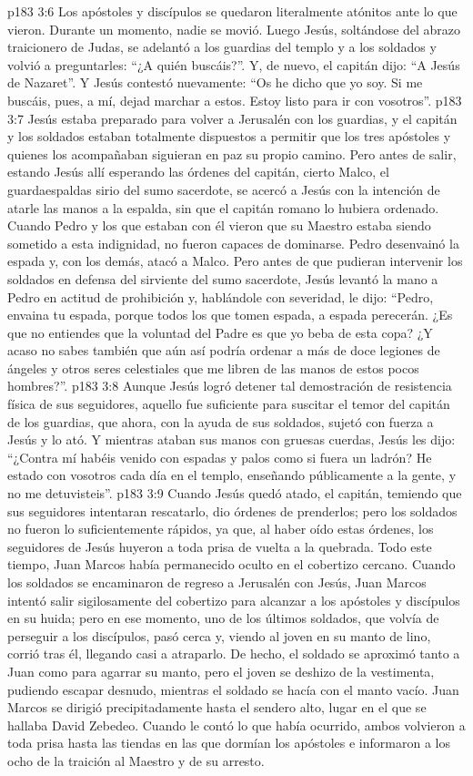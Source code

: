 \vs p183 3:6 Los apóstoles y discípulos se quedaron literalmente atónitos ante lo que vieron. Durante un momento, nadie se movió. Luego Jesús, soltándose del abrazo traicionero de Judas, se adelantó a los guardias del templo y a los soldados y volvió a preguntarles: “¿A quién buscáis?”. Y, de nuevo, el capitán dijo: “A Jesús de Nazaret”. Y Jesús contestó nuevamente: “Os he dicho que yo soy. Si me buscáis, pues, a mí, dejad marchar a estos. Estoy listo para ir con vosotros”.
\vs p183 3:7 Jesús estaba preparado para volver a Jerusalén con los guardias, y el capitán y los soldados estaban totalmente dispuestos a permitir que los tres apóstoles y quienes los acompañaban siguieran en paz su propio camino. Pero antes de salir, estando Jesús allí esperando las órdenes del capitán, cierto Malco, el guardaespaldas sirio del sumo sacerdote, se acercó a Jesús con la intención de atarle las manos a la espalda, sin que el capitán romano lo hubiera ordenado. Cuando Pedro y los que estaban con él vieron que su Maestro estaba siendo sometido a esta indignidad, no fueron capaces de dominarse. Pedro desenvainó la espada y, con los demás, atacó a Malco. Pero antes de que pudieran intervenir los soldados en defensa del sirviente del sumo sacerdote, Jesús levantó la mano a Pedro en actitud de prohibición y, hablándole con severidad, le dijo: “Pedro, envaina tu espada, porque todos los que tomen espada, a espada perecerán. ¿Es que no entiendes que la voluntad del Padre es que yo beba de esta copa? ¿Y acaso no sabes también que aún así podría ordenar a más de doce legiones de ángeles y otros seres celestiales que me libren de las manos de estos pocos hombres?”.
\vs p183 3:8 Aunque Jesús logró detener tal demostración de resistencia física de sus seguidores, aquello fue suficiente para suscitar el temor del capitán de los guardias, que ahora, con la ayuda de sus soldados, sujetó con fuerza a Jesús y lo ató. Y mientras ataban sus manos con gruesas cuerdas, Jesús les dijo: “¿Contra mí habéis venido con espadas y palos como si fuera un ladrón? He estado con vosotros cada día en el templo, enseñando públicamente a la gente, y no me detuvisteis”.
\vs p183 3:9 Cuando Jesús quedó atado, el capitán, temiendo que sus seguidores intentaran rescatarlo, dio órdenes de prenderlos; pero los soldados no fueron lo suficientemente rápidos, ya que, al haber oído estas órdenes, los seguidores de Jesús huyeron a toda prisa de vuelta a la quebrada. Todo este tiempo, Juan Marcos había permanecido oculto en el cobertizo cercano. Cuando los soldados se encaminaron de regreso a Jerusalén con Jesús, Juan Marcos intentó salir sigilosamente del cobertizo para alcanzar a los apóstoles y discípulos en su huida; pero en ese momento, uno de los últimos soldados, que volvía de perseguir a los discípulos, pasó cerca y, viendo al joven en su manto de lino, corrió tras él, llegando casi a atraparlo. De hecho, el soldado se aproximó tanto a Juan como para agarrar su manto, pero el joven se deshizo de la vestimenta, pudiendo escapar desnudo, mientras el soldado se hacía con el manto vacío. Juan Marcos se dirigió precipitadamente hasta el sendero alto, lugar en el que se hallaba David Zebedeo. Cuando le contó lo que había ocurrido, ambos volvieron a toda prisa hasta las tiendas en las que dormían los apóstoles e informaron a los ocho de la traición al Maestro y de su arresto.
